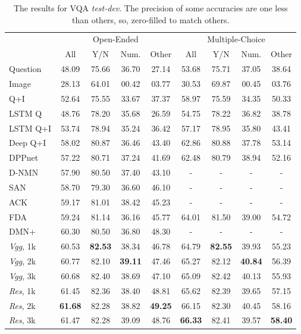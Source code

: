 \documentclass{article}
\begin{document}
\begin{table}[h]
\caption{The results for VQA \textit{test-dev}. The precision of some accuracies \cite{Yang2015,Andreas2016,Xiong2016} are one less than others, so, zero-filled to match others.}
\label{tab:results}
\centering
\begin{tabular}{lcccccccc}
\toprule
& \multicolumn{4}{c}{Open-Ended} & \multicolumn{4}{c}{Multiple-Choice}\\
\cmidrule{2-5}
\cmidrule{6-9}
 & All & Y/N & Num. & Other & All & Y/N & Num. & Other\\
\midrule
Question \cite{Antol2015} 
         & 48.09 & 75.66 &  36.70& 27.14 
         & 53.68 & 75.71 & 37.05 & 38.64\\
Image \cite{Antol2015}   
         & 28.13 & 64.01 & 00.42 & 03.77  
         & 30.53 & 69.87 & 00.45 & 03.76\\
Q+I  \cite{Antol2015}     
         & 52.64 & 75.55 & 33.67 & 37.37 
         & 58.97 & 75.59 & 34.35 & 50.33\\
LSTM Q \cite{Antol2015}   
         & 48.76 & 78.20 & 35.68 & 26.59 
         & 54.75 & 78.22 & 36.82 &38.78\\
LSTM Q+I \cite{Antol2015} 
         & 53.74 & 78.94 & 35.24 & 36.42 
         & 57.17 & 78.95& 35.80 & 43.41\\
Deep Q+I \cite{Lu2015}
         & 58.02 & 80.87 & 36.46 & 43.40 
         & 62.86 & 80.88 & 37.78 & 53.14\\
\midrule
DPPnet \cite{Noh2015}
         & 57.22 & 80.71 & 37.24 & 41.69
         & 62.48 & 80.79 & 38.94 & 52.16\\
D-NMN \cite{Andreas2016}
         & 57.90 & 80.50 & 37.40 & 43.10
         & - & - & - & - \\
SAN    \cite{Yang2015}
         & 58.70 & 79.30 & 36.60 & 46.10
         & - & - & - & - \\
ACK    \cite{Wu2016}
         & 59.17 & 81.01 & 38.42 & 45.23
         & - & - & - & - \\
FDA    \cite{Ilievski2016}
         & 59.24 & 81.14 & 36.16 & 45.77
         & 64.01 & 81.50 & 39.00 & 54.72\\
DMN+ \cite{Xiong2016}
         & 60.30 & 80.50 & 36.80 & 48.30
         & - & - & - & - \\
\midrule
  \textit{Vgg}, 1k & 
     60.53 & \textbf{82.53} & 38.34 & 46.78 & 64.79 & \textbf{82.55} & 39.93 & 55.23 \\
  \textit{Vgg}, 2k & 
     60.77 & 82.10 & \textbf{39.11} & 47.46 & 65.27 & 82.12 & \textbf{40.84} & 56.39 \\
  \textit{Vgg}, 3k & 
     60.68 & 82.40 & 38.69 & 47.10 & 65.09 & 82.42 & 40.13 & 55.93 \\
  \textit{Res}, 1k & 
     61.45 & 82.36 & 38.40 & 48.81 & 65.62 & 82.39 & 39.65 & 57.15 \\
  \textit{Res}, 2k & 
     \textbf{61.68} & 82.28 & 38.82 & \textbf{49.25} & 66.15 & 82.30 & 40.45 &58.16 \\
  \textit{Res}, 3k & 61.47 & 82.28 & 39.09 & 48.76 & \textbf{66.33} & 82.41 &  39.57 & \textbf{58.40} \\
\bottomrule
\end{tabular}
\end{table}
\end{document}
